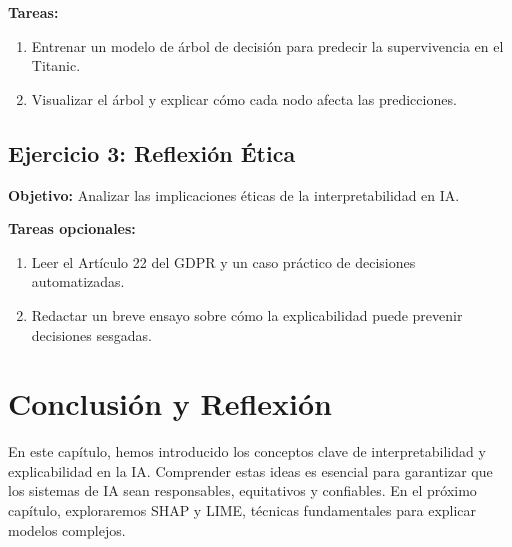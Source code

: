 \begin{refsection}
\textbf{Tareas:}
\begin{enumerate}
    \item Entrenar un modelo de árbol de decisión para predecir la supervivencia en el Titanic.
    \item Visualizar el árbol y explicar cómo cada nodo afecta las predicciones.
\end{enumerate}

\subsection{Ejercicio 3: Reflexión Ética}
\textbf{Objetivo:} Analizar las implicaciones éticas de la interpretabilidad en IA.

\textbf{Tareas opcionales:}
\begin{enumerate}
    \item Leer el Artículo 22 del GDPR y un caso práctico de decisiones automatizadas.
    \item Redactar un breve ensayo sobre cómo la explicabilidad puede prevenir decisiones sesgadas.
\end{enumerate}

\section{Conclusión y Reflexión}
En este capítulo, hemos introducido los conceptos clave de interpretabilidad y explicabilidad en la IA. Comprender estas ideas es esencial para garantizar que los sistemas de IA sean responsables, equitativos y confiables. En el próximo capítulo, exploraremos SHAP y LIME, técnicas fundamentales para explicar modelos complejos.


\nocite{*}
\printbibliography[heading=subbibliography, title={Bibliografía del Capítulo 1}]
\end{refsection}
